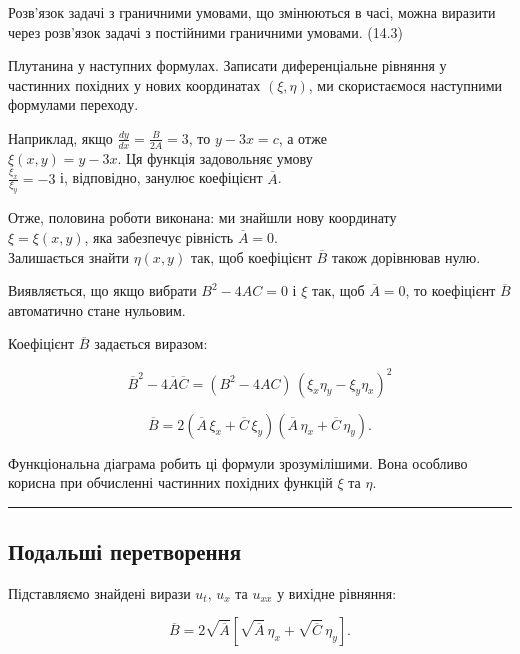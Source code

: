 \documentclass[
  ukrainian,
]{article}
\begin{document}
Розв'язок задачі з граничними умовами, що змінюються в часі, можна
виразити через розв'язок задачі з постійними граничними умовами. (14.3)

Плутанина у наступних формулах. Записати диференціальне рівняння у
частинних похідних у нових координатах \((\xi, \eta)\), ми скористаємося
наступними формулами переходу.

Наприклад, якщо \(\frac{dy}{dx} = \frac{B}{2A} = 3\), то \(y - 3x = c\),
а отже\\
\(\xi(x, y) = y - 3x\). Ця функція задовольняє умову\\
\(\frac{\xi_x}{\xi_y} = -3\) і, відповідно, занулює коефіцієнт
\(\overline{A}\).

Отже, половина роботи виконана: ми знайшли нову координату\\
\(\xi = \xi(x, y)\), яка забезпечує рівність \(\overline{A} = 0\).\\
Залишається знайти \(\eta(x, y)\) так, щоб коефіцієнт \(\overline{B}\)
також дорівнював нулю.

Виявляється, що якщо вибрати \(B^2 - 4AC = 0\) і \(\xi\) так, щоб
\(\overline{A} = 0\), то коефіцієнт \(\overline{B}\) автоматично стане
нульовим.

Коефіцієнт \(\overline{B}\) задається виразом:

\[
\overline{B}^2 - 4\overline{A}\overline{C} = (B^2 - 4AC)\,(\xi_x \eta_y - \xi_y \eta_x)^2
\]

\[
\overline{B} = 2\left( \overline{A}\,\xi_x + \overline{C}\,\xi_y \right)
\left( \overline{A}\,\eta_x + \overline{C}\,\eta_y \right).
\]

Функціональна діаграма робить ці формули зрозумілішими. Вона особливо
корисна при обчисленні частинних похідних функцій \(\xi\) та \(\eta\).

\begin{center}\rule{0.5\linewidth}{0.5pt}\end{center}

\subsection{Подальші
перетворення}\label{ux43fux43eux434ux430ux43bux44cux448ux456-ux43fux435ux440ux435ux442ux432ux43eux440ux435ux43dux43dux44f}

Підставляємо знайдені вирази \(u_t\), \(u_x\) та \(u_{xx}\) у вихідне
рівняння:

\[
\overline{B} = 2\sqrt{\overline{A}} \left[ \sqrt{\overline{A}}\, \eta_x + \sqrt{\overline{C}}\, \eta_y \right].
\]
\end{document}

